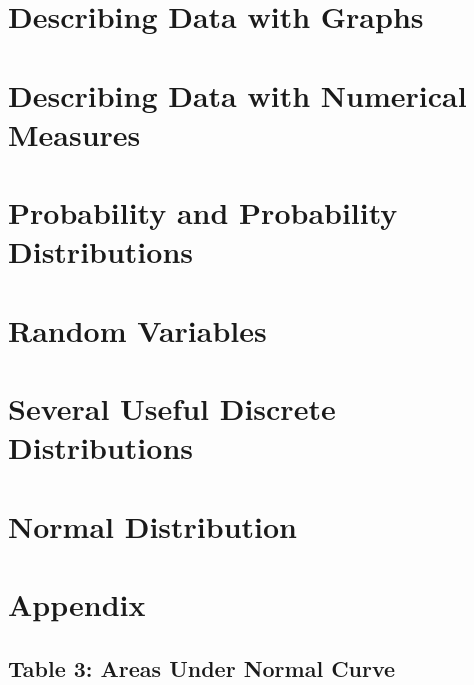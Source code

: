\documentclass{package/notes}
\begin{document}
\chapter{Describing Data with Graphs}



\chapter{Describing Data with Numerical Measures}


\chapter{Probability and Probability Distributions}


\chapter{Random Variables}



\chapter{Several Useful Discrete Distributions}



\chapter{Normal Distribution}



\chapter{Appendix}

\section{Table 3: Areas Under Normal Curve}
\end{document}
